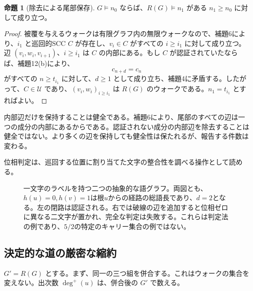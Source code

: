 \documentclass[11pt,reqno]{amsart}
\theoremstyle{definition}
\newtheorem{proposition}[theorem]{命題}
\theoremstyle{definition}
\theoremstyle{remark}
\begin{document}
\begin{samepage}
\begin{proposition}[除去による尾部保存]\leavevmode\label{thm:13}
\(G\models n_0\) ならば、\(R(G)\models n_1\) がある \(n_1\ge n_0\) に対して成り立つ。
\label{thm-end:13}
\end{proposition}
\end{samepage}

\begin{proof}\leavevmode\label{proof:13}
被覆を与えるウォークは有限グラフ内の無限ウォークなので、補題6により、\(i_1\) と巡回的SCC \(C\) が存在し、\(v_i\in C\) がすべての \(i\ge i_1\) に対して成り立つ。辺 \((v_i,w_i,v_{i+1})\)、\(i\ge i_1\) は \(C\) の内部にある。もし \(C\) が認証されていたならば、補題12(b)により、
\[
c_{n+d}=c_n
\]
がすべての \(n\ge t_{i_1}\) に対して、\(d\ge1\) として成り立ち、補題4に矛盾する。したがって、\(C\in\mathcal U\) であり、\((v_i,w_i)_{i\ge i_1}\) は \(R(G)\) のウォークである。\(n_1=t_{i_1}\) とすればよい。\qedhere
\end{proof}

内部辺だけを保持することは健全である。補題6により、尾部のすべての辺は一つの成分の内部にあるからである。認証されない成分の内部辺を除去することは健全ではない。より多くの辺を保持しても健全性は保たれるが、報告する件数は変わる。

位相判定は、巡回する位置に割り当てた文字の整合性を調べる操作として読める。

\begin{figure}[htbp]
\centering

\caption{一文字のラベルを持つ二つの抽象的な語グラフ。両図とも、\(h(u)=0,h(v)=1\)は根\(u\)からの経路の総語長であり、\(d=2\)となる。左の閉路は認証される。右では破線の辺を追加すると位相ゼロに異なる二文字が置かれ、完全な判定は失敗する。これらは判定法の例であり、\(5/2\)の特定のキャリー集合の例ではない。}
\label{fig:phase-test}
\end{figure}

\subsection{決定的な道の厳密な縮約}\label{sec:4.3}

\(G'=R(G)\) とする。まず、同一の三つ組を併合する。これはウォークの集合を変えない。出次数 \(\deg^+(u)\) は、併合後の \(G'\) で数える。
\end{document}
